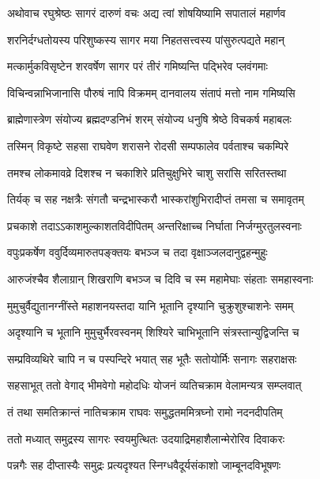 
\twolineshloka
{अथोवाच रघुश्रेष्ठः सागरं दारुणं वचः}
{अद्य त्वां शोषयिष्यामि सपातालं महार्णव} %

\twolineshloka
{शरनिर्दग्धतोयस्य परिशुष्कस्य सागर}
{मया निहतसत्त्वस्य पांसुरुत्पद्यते महान्} %

\twolineshloka
{मत्कार्मुकविसृष्टेन शरवर्षेण सागर}
{परं तीरं गमिष्यन्ति पद्भिरेव प्लवंगमाः} %

\twolineshloka
{विचिन्वन्नाभिजानासि पौरुषं नापि विक्रमम्}
{दानवालय संतापं मत्तो नाम गमिष्यसि} %

\twolineshloka
{ब्राह्मेणास्त्रेण संयोज्य ब्रह्मदण्डनिभं शरम्}
{संयोज्य धनुषि श्रेष्ठे विचकर्ष महाबलः} %

\twolineshloka
{तस्मिन् विकृष्टे सहसा राघवेण शरासने}
{रोदसी सम्पफालेव पर्वताश्च चकम्पिरे} %

\twolineshloka
{तमश्च लोकमावव्रे दिशश्च न चकाशिरे}
{प्रतिचुक्षुभिरे चाशु सरांसि सरितस्तथा} %

\twolineshloka
{तिर्यक् च सह नक्षत्रैः संगतौ चन्द्रभास्करौ}
{भास्करांशुभिरादीप्तं तमसा च समावृतम्} %

\twolineshloka
{प्रचकाशे तदाऽऽकाशमुल्काशतविदीपितम्}
{अन्तरिक्षाच्च निर्घाता निर्जग्मुरतुलस्वनाः} %

\twolineshloka
{वपुःप्रकर्षेण ववुर्दिव्यमारुतपङ्क्तयः}
{बभञ्ज च तदा वृक्षाञ्जलदानुद्वहन्मुहुः} %

\twolineshloka
{आरुजंश्चैव शैलाग्रान् शिखराणि बभञ्ज च}
{दिवि च स्म महामेघाः संहताः समहास्वनाः} %

\twolineshloka
{मुमुचुर्वैद्युतानग्नींस्ते महाशनयस्तदा}
{यानि भूतानि दृश्यानि चुक्रुशुश्चाशनेः समम्} %

\twolineshloka
{अदृश्यानि च भूतानि मुमुचुर्भैरवस्वनम्}
{शिश्यिरे चाभिभूतानि संत्रस्तान्युद्विजन्ति च} %

\twolineshloka
{सम्प्रविव्यथिरे चापि न च पस्पन्दिरे भयात्}
{सह भूतैः सतोयोर्मिः सनागः सहराक्षसः} %

\twolineshloka
{सहसाभूत् ततो वेगाद् भीमवेगो महोदधिः}
{योजनं व्यतिचक्राम वेलामन्यत्र सम्प्लवात्} %

\twolineshloka
{तं तथा समतिक्रान्तं नातिचक्राम राघवः}
{समुद्धतममित्रघ्नो रामो नदनदीपतिम्} %

\twolineshloka
{ततो मध्यात् समुद्रस्य सागरः स्वयमुत्थितः}
{उदयाद्रिमहाशैलान्मेरोरिव दिवाकरः} %

\twolineshloka
{पन्नगैः सह दीप्तास्यैः समुद्रः प्रत्यदृश्यत}
{स्निग्धवैदूर्यसंकाशो जाम्बूनदविभूषणः} %


